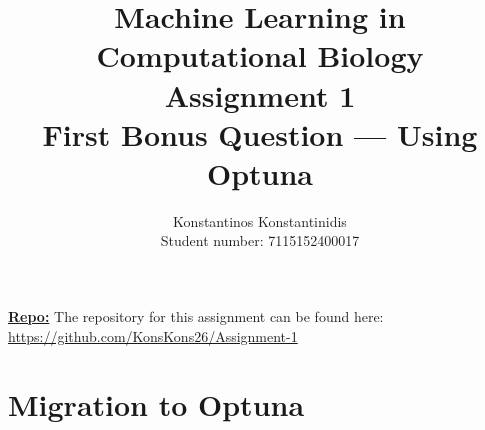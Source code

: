 \documentclass[12pt]{article}
\title{%
    Machine Learning in Computational Biology \\
    \Large Assignment 1 \\
    First Bonus Question --- Using Optuna
    }
\author{%
    Konstantinos Konstantinidis \\
    Student number: 7115152400017
    }
\begin{document}
\maketitle

\vspace{0.5in}

\textbf{\underline{Repo:}} The repository for this assignment can be found here: \\
\url{https://github.com/KonsKons26/Assignment-1}

\vspace{0.5in}

\tableofcontents
\clearpage

\section{Migration to Optuna}
\end{document}
